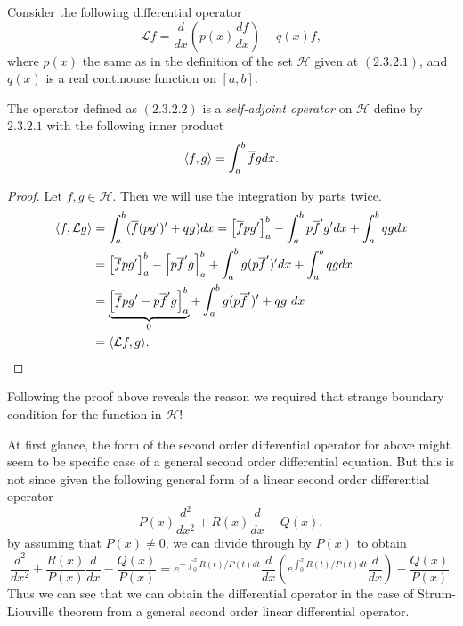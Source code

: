 \noindent Consider the following differential operator
\[  \mathcal{L} f = \frac{d}{dx}(p(x)\frac{df}{dx}) - q(x)f, \tag{2.3.2.2}\]
where $p(x)$ the same as in the definition of the set $\mathscr{H}$ given at $(2.3.2.1)$, and $q(x)$ is a real continouse function on $[a,b]$. 

\begin{proposition}
	The operator defined as $(2.3.2.2)$ is a \emph{self-adjoint operator} on $\mathscr{H}$ define by $2.3.2.1$ with the following inner product
	\[ \langle f, g \rangle = \int_{a}^{b} \overline{f}g dx. \]
\end{proposition}

\begin{proof}
	Let $f,g \in \mathscr{H}$. Then we will use the integration by parts twice.
	\begin{align*}
		\langle f, \mathcal{L}g \rangle &= \int_{a}^{b} (\overline{f}(pg')' + qg)dx = \left[ \overline{f}pg' \right]_a^b - \int_{a}^{b}p\overline{f}'g'dx + \int_{a}^{b}qgdx \\
		&= \left[ \overline{f}pg' \right]_a^b - \left[ p\overline{f}'g \right]_a^b + \int_{a}^{b}g(p\overline{f}')' dx + \int_{a}^{b}qgdx\\
		&=\underbrace{ \left[ \overline{f}pg' - p\overline{f}'g \right]_a^b}_{0} + \int_{a}^{b}g(p\overline{f}')' + qg\ dx \\
		&= \langle \mathcal{L}f, g \rangle.
	\end{align*}
\end{proof}
\begin{remark}
	Following the proof above reveals the reason we required that strange boundary condition for the function in $\mathscr{H}$!
\end{remark}




\begin{remark}
	At first glance, the form of the second order differential operator for above might seem to be specific case of a general second order differential equation. But this is not since given the following general form of a linear second order differential operator
	\[ P(x)\frac{d^2}{dx^2} + R(x)\frac{d}{dx} - Q(x), \]
	by assuming that $P(x) \neq 0$, we can divide through by $P(x)$ to obtain
	\[ \frac{d^2}{dx^2} + \frac{R(x)}{P(x)}\frac{d}{dx} - \frac{Q(x)}{P(x)} = e^{-\int_{0}^{x}R(t)/P(t)dt}\frac{d}{dx}(e^{\int_{0}^{x}R(t)/P(t)dt}\frac{d}{dx})-\frac{Q(x)}{P(x)}. \]
	Thus we can see that we can obtain the differential operator in the case of Strum-Liouville theorem from a general second order linear differential operator.
\end{remark}


